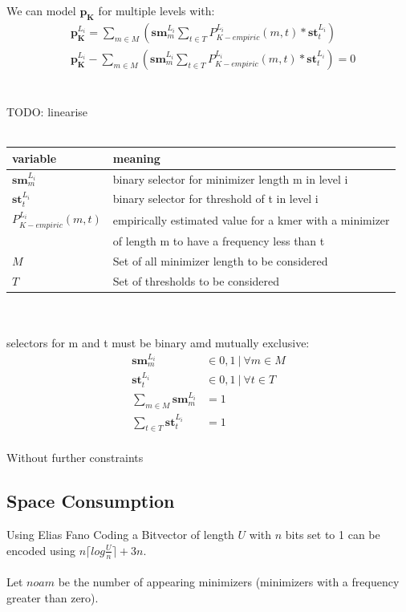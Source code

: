 \documentclass{article}
\newcommand{\noam}{noam} %
\newcommand{\percKmers}{\textbf{p}_\textbf{K}}
\newcommand{\percKmersEmpiric}{P_{K-empiric}}
\newcommand{\selectorm}{\textbf{sm}}
\newcommand{\selectort}{\textbf{st}}
\newcommand{\levelI}{{L_i}}
\begin{document}
We can model $\percKmers$ for multiple levels with:
\begin{align*}
	&\percKmers^\levelI = \sum_{m \in M} \left( \selectorm_m^\levelI \sum_{t \in T} \percKmersEmpiric^\levelI(m, t) * \selectort_t^\levelI\right)\\
	&\percKmers^\levelI - \sum_{m \in M} \left( \selectorm_m^\levelI \sum_{t \in T} \percKmersEmpiric^\levelI(m, t) * \selectort_t^\levelI\right)= 0
\end{align*}
\\
\\
TODO: linearise
\\
\\

\begin{tabular}{ l | l }
	variable	& meaning \\
	\hline
	$\selectorm_m^\levelI$	& binary selector for minimizer length m in level i\\
	$\selectort_t^\levelI$	& binary selector for threshold of t in level i\\
	$\percKmersEmpiric^\levelI(m, t)$ &empirically estimated value for a kmer with a minimizer \\
				& of length m to have a frequency less than t \\
	$M$			& Set of all minimizer length to be considered \\
	$T$			& Set of thresholds to be considered \\
\end{tabular}
\\
\\
selectors for m and t must be binary amd mutually exclusive:
\begin{align*}
	\selectorm_m^\levelI &\in {0,1} ~|~ \forall m \in M \\
	\selectort_t^\levelI &\in {0,1} ~|~ \forall t \in T \\
	\sum_{m \in M} \selectorm_m^\levelI &= 1 \\
	\sum_{t \in T} \selectort_t^\levelI &= 1 \\
\end{align*}

Without further constraints

\subsection*{Space Consumption} \label{sec:space}

Using Elias Fano Coding a Bitvector of length $U$ with $n$ bits set to 1 can be encoded using $n \lceil log \frac{U}{n} \rceil + 3n$.\\
\\
Let $\noam$ be the number of appearing minimizers (minimizers with a frequency greater than zero).
\end{document}
